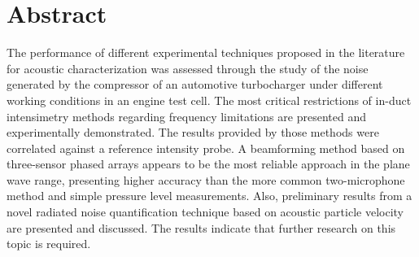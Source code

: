 \documentclass[final,twoside,11pt]{book}
\makeatletter
\numberwithin{equation}{section}
\numberwithin{figure}{chapter}
\numberwithin{table}{chapter}
\def\cleardoublepage{\clearpage\if@twoside \ifodd\c@page\else
  \hbox{}
  \thispagestyle{empty}
  \newpage
  \if@twocolumn\hbox{}\newpage\fi\fi\fi}
\makeatother
\begin{document}
\chapter*{Abstract}
The performance of different experimental techniques proposed in the literature for acoustic characterization was assessed through the study of the noise generated by the compressor of an automotive turbocharger under different working conditions in an engine test cell. The most critical restrictions of in-duct intensimetry methods regarding frequency limitations are presented and experimentally demonstrated. The results provided by those methods were correlated against a reference intensity probe. A beamforming method based on three-sensor phased arrays appears to be the most reliable approach in the plane wave range, presenting higher accuracy than the more common two-microphone method and simple pressure level measurements. Also, preliminary results from a novel radiated noise quantification technique based on acoustic particle velocity are presented and discussed. The results indicate that further research on this topic is required.


\tableofcontents
\cleardoublepage

\null\vspace{2cm}
\end{document}
